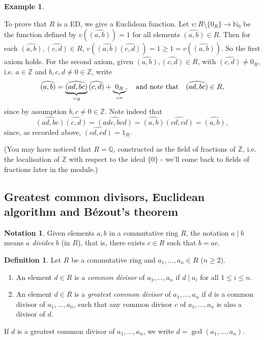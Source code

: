 \documentclass[12pt]{article}
\newcommand{\qbox}[1]{\quad\hbox{#1}\quad}
\theoremstyle{definition}
\newtheorem{defn}[thm]{Definition}
\newtheorem{nota}[thm]{Notation}
\newtheorem{example}[thm]{Example}
\newcounter{ex}\renewcommand\theex{\arabic{ex}}
\newcommand{\N}{\ensuremath{\mathbb{N}}}
\newcommand{\Z}{\ensuremath{\mathbb{Z}}}
\newcommand{\Q}{\ensuremath{\mathbb{Q}}}
\newcommand{\wh}[1]{\widehat{#1}}
\begin{document}
\begin{example}
\begin{enumerate}
To prove that $R$ is a ED, we give a Euclidean function.
Let $v:R\setminus\{0_R\}\to\N_0$ be the function defined by
$v(\wh{(a,b)})=1$ for all elements $\wh{(a,b)}\in R$.
Then for each $\wh{(a,b)},\wh{(c,d)}\in R$,
$v(\wh{(a,b)}\wh{(c,d)})=1\geq1=v(\wh{(a,b)})$. So the first axiom
holds. For the second axiom, given $\wh{(a,b)},\wh{(c,d)}\in R$, with
$\wh{(c,d)}\neq0_R$, i.e. $a\in\Z$ and $b,c,d\neq0\in\Z$, write 
$$\wh{(a,b)}=\underbrace{\wh{(ad,bc)}}_{=q}\wh{(c,d)}+\underbrace{0_R}_{=r},
\qbox{and note that}\wh{(ad,bc)}\in R,$$
since by assumption $b,c\neq0\in\Z$. Note indeed that
$$\wh{(ad,bc)}\wh{(c,d)}=\wh{(adc,bcd)}=\wh{(a,b)}\wh{(cd,cd)}=\wh{(a,b)},$$
since, as recorded above, $\wh{(cd,cd)}=1_R$.

(You may have noticed that $R=\Q$, constructed as the
field of fractions of $\Z$, i.e. the localisation of $\Z$ with respect
to the ideal $\{0\}$ - we'll come back to
fields of fractions later in the module.)
\end{enumerate}
\end{example}



\subsection{Greatest common divisors, Euclidean algorithm and
B\'ezout's theorem}\label{ssec:gcd} 

\begin{nota}
Given
elements $a,b$ in a commutative ring $R$, the notation
$a\mid b$ means {\em $a$ divides $b$} (in $R$), that is, there exists
$c\in R$ such that $b=ac$.
\end{nota}

\begin{defn}\label{def:gcd}
Let $R$ be a commutative ring and $a_1,\dots,a_n\in R$ ($n\geq2$).
\begin{enumerate}
\item An element $d\in R$ is a {\em common divisor} of $a_1,\dots,a_n$
if $d\mid a_i$ for all $1\leq i\leq n$.
\item An element $d\in R$ is a {\em greatest common divisor} of
$a_1,\dots,a_n$ if $d$ is a common divisor of $a_1,\dots,a_n$, such
that any common divisor $c$ of $a_1,\dots,a_n$ is also a divisor of
$d$. 
\end{enumerate}
If $d$ is a greatest common divisor of $a_1,\dots,a_n$, we write
$d=\gcd(a_1,\dots,a_n)$. 
\end{defn}
\end{document}
